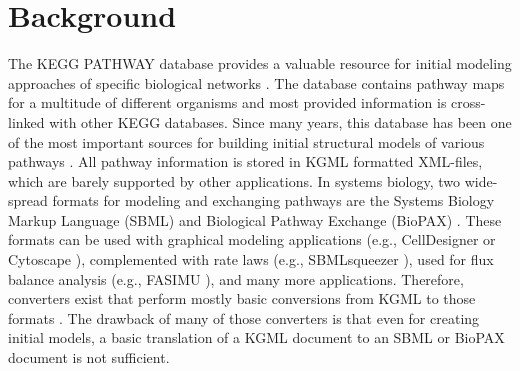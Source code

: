 \documentclass[10pt]{bmc_article}
\newenvironment{bmcformat}{\baselineskip20pt\sloppy\setboolean{publ}{false}}{\baselineskip20pt\sloppy}
\begin{document}
\begin{bmcformat}








\section*{Background}

The KEGG PATHWAY database provides a valuable resource for initial modeling approaches of specific biological networks \cite{Kanehisa2000,KEGG}. The database contains pathway maps for a multitude of different organisms and most provided information is cross-linked with other KEGG databases. Since many years, this database has been one of the most important sources for building initial structural models of various pathways \cite{Bauer-Mehren2009,Oberhardt2009}. All pathway information is stored in KGML formatted XML-files, which are barely supported by other applications. In systems biology, two wide-spread formats for modeling and exchanging pathways are the Systems Biology Markup Language (SBML) \cite{Finney2003} and Biological Pathway Exchange (BioPAX) \cite{Demir2010_short}. These formats can be used with graphical modeling applications (e.g., CellDesigner \cite{Funahashi2008} or Cytoscape \cite{Cytoscape}), complemented with rate laws (e.g., SBMLsqueezer \cite{SBMLSqueezer}), used for flux balance analysis (e.g., FASIMU \cite{Fasimu}), and many more applications. Therefore, converters exist that perform mostly basic conversions from KGML to those formats \cite{KEGG2SBML,Kuentzer2007,KEGGconverter,KEGG2BioPAX_and_SBML}. The drawback of many of those converters is that even for creating initial models, a basic translation of a KGML document to an SBML or BioPAX document is not sufficient.


\end{bmcformat}
\end{document}
